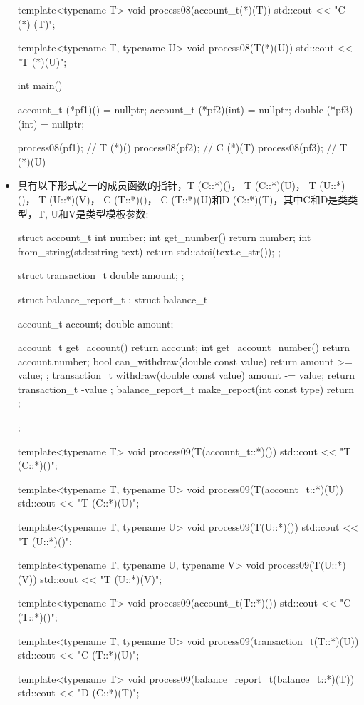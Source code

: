 \begin{itemize}
\begin{cpp}
template<typename T>
void process08(account_t(*)(T))
{ std::cout << "C (*) (T)\n"; }

template<typename T, typename U>
void process08(T(*)(U)) { std::cout << "T (*)(U)\n"; }

int main()
{
	account_t (*pf1)() = nullptr;
	account_t (*pf2)(int) = nullptr;
	double (*pf3)(int) = nullptr;
	
	process08(pf1); // T (*)()
	process08(pf2); // C (*)(T)
	process08(pf3); // T (*)(U)
}
\end{cpp}

\item
具有以下形式之一的成员函数的指针，T (C::*)()， T (C::*)(U)， T (U::*)()， T (U::*)(V)， C (T::*)()， C (T::*)(U)和D (C::*)(T)，其中C和D是类类型，T, U和V是类型模板参数:

\begin{cpp}
struct account_t
{
	int number;
	int get_number() { return number; }
	int from_string(std::string text) {
		return std::atoi(text.c_str()); }
};

struct transaction_t
{
	double amount;
};

struct balance_report_t {};
struct balance_t
{
	account_t account;
	double amount;
	
	account_t get_account() { return account; }
	int get_account_number() { return account.number; }
	bool can_withdraw(double const value)
		{return amount >= value; };
	transaction_t withdraw(double const value) {
		amount -= value; return transaction_t{ -value }; }
	balance_report_t make_report(int const type)
	{return {}; }
};

template<typename T>
void process09(T(account_t::*)())
{ std::cout << "T (C::*)()\n"; }

template<typename T, typename U>
void process09(T(account_t::*)(U))
{ std::cout << "T (C::*)(U)\n"; }

template<typename T, typename U>
void process09(T(U::*)())
{ std::cout << "T (U::*)()\n"; }

template<typename T, typename U, typename V>
void process09(T(U::*)(V))
{ std::cout << "T (U::*)(V)\n"; }

template<typename T>
void process09(account_t(T::*)())
{ std::cout << "C (T::*)()\n"; }

template<typename T, typename U>
void process09(transaction_t(T::*)(U))
{ std::cout << "C (T::*)(U)\n"; }

template<typename T>
void process09(balance_report_t(balance_t::*)(T))
{ std::cout << "D (C::*)(T)\n"; }


\end{cpp}
\end{itemize}
